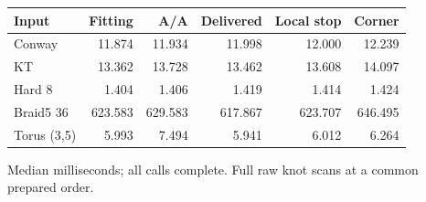 \begin{center}\small
\begin{tabular}{@{}lrrrrr@{}}
\toprule
Input & Fitting & A/A & Delivered & Local stop & Corner \\
\midrule
Conway & 11.874 & 11.934 & 11.998 & 12.000 & 12.239 \\
KT & 13.362 & 13.728 & 13.462 & 13.608 & 14.097 \\
Hard 8 & 1.404 & 1.406 & 1.419 & 1.414 & 1.424 \\
Braid5 36 & 623.583 & 629.583 & 617.867 & 623.707 & 646.495 \\
Torus (3,5) & 5.993 & 7.494 & 5.941 & 6.012 & 6.264 \\
\bottomrule
\end{tabular}
\end{center}
Median milliseconds; all calls complete. Full raw knot scans at a common prepared order.
